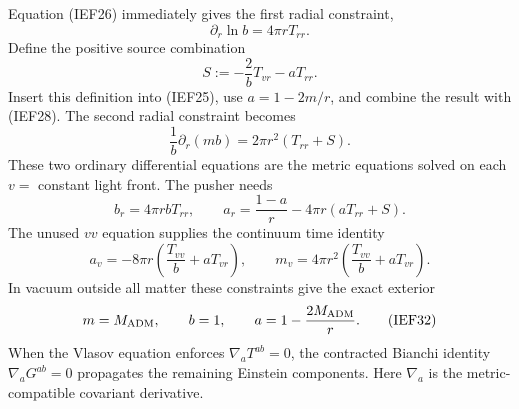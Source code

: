 Equation (IEF26) immediately gives the first radial constraint,
\[
 \boxed{\partial_r\ln b=4\pi rT_{rr}.}                    \tag{IEF28}
\]
Define the positive source combination
\[
 S:=-\frac{2}{b}T_{vr}-aT_{rr}.                           \tag{IEF23a}
\]
Insert this definition into (IEF25), use \(a=1-2m/r\), and combine the result
with (IEF28).  The second radial constraint becomes
\[
 \boxed{\frac1b\partial_r(mb)
       =2\pi r^2(T_{rr}+S).}                              \tag{IEF29}
\]
These two ordinary differential equations are the metric equations solved on
each \(v=\) constant light front.  The pusher needs
\[
 b_r=4\pi rbT_{rr},\qquad
 a_r=\frac{1-a}{r}-4\pi r(aT_{rr}+S).                    \tag{IEF30}
\]
The unused \(vv\) equation supplies the continuum time identity
\[
 a_v=-8\pi r\left(\frac{T_{vv}}b+aT_{vr}\right),\qquad
 m_v=4\pi r^2\left(\frac{T_{vv}}b+aT_{vr}\right).         \tag{IEF31}
\]
In vacuum outside all matter these constraints give the exact exterior
\[
 m=M_{\rm ADM},\qquad b=1,\qquad
 a=1-\frac{2M_{\rm ADM}}r.                               \tag{IEF32}
\]
When the Vlasov equation enforces \(\nabla_aT^{ab}=0\), the contracted Bianchi
identity \(\nabla_aG^{ab}=0\) propagates the remaining Einstein components.
Here \(\nabla_a\) is the metric-compatible covariant derivative.

